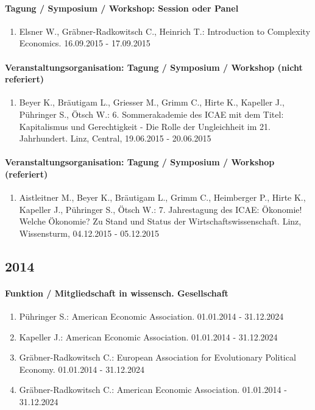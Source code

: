 \paragraph{Tagung / Symposium / Workshop: Session oder Panel}
\begin{enumerate}[leftmargin=*, labelsep=0.5cm]
\item Elsner W., Gräbner-Radkowitsch C., Heinrich T.: Introduction to Complexity Economics. 16.09.2015 - 17.09.2015
\end{enumerate}
\paragraph{Veranstaltungsorganisation: Tagung / Symposium / Workshop (nicht referiert)}
\begin{enumerate}[leftmargin=*, labelsep=0.5cm]
\item Beyer K., Bräutigam L., Griesser M., Grimm C., Hirte K., Kapeller J., Pühringer S., Ötsch W.: 6. Sommerakademie des ICAE mit dem Titel: Kapitalismus und Gerechtigkeit - Die Rolle der Ungleichheit im 21. Jahrhundert. Linz, Central, 19.06.2015 - 20.06.2015
\end{enumerate}
\paragraph{Veranstaltungsorganisation: Tagung / Symposium / Workshop (referiert)}
\begin{enumerate}[leftmargin=*, labelsep=0.5cm]
\item Aistleitner M., Beyer K., Bräutigam L., Grimm C., Heimberger P., Hirte K., Kapeller J., Pühringer S., Ötsch W.: 7. Jahrestagung des ICAE: Ökonomie! Welche Ökonomie? Zu Stand und Status der Wirtschaftswissenschaft. Linz, Wissensturm, 04.12.2015 - 05.12.2015
\end{enumerate}\subsection*{2014}\paragraph{Funktion / Mitgliedschaft in wissensch. Gesellschaft}
\begin{enumerate}[leftmargin=*, labelsep=0.5cm]
\item Pühringer S.: American Economic Association. 01.01.2014 - 31.12.2024
\item Kapeller J.: American Economic Association. 01.01.2014 - 31.12.2024
\item Gräbner-Radkowitsch C.: European Association for Evolutionary Political Economy. 01.01.2014 - 31.12.2024
\item Gräbner-Radkowitsch C.: American Economic Association. 01.01.2014 - 31.12.2024
\end{enumerate}
